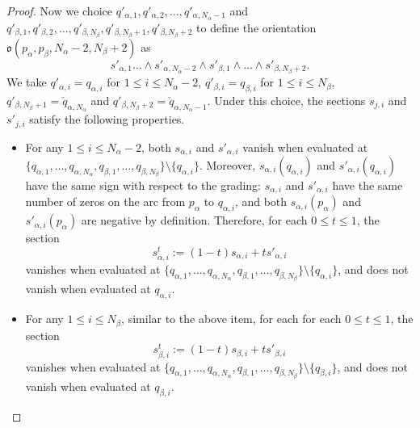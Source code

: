 \documentclass[10pt,a4paper]{amsart}
\begin{document}
\begin{proof}
    Now we choice $q'_{\alpha,1},q'_{\alpha,2},\dots,q'_{\alpha,{N_\alpha-1}}$ and $q'_{\beta,1},q'_{\beta,2},\dots,q'_{\beta,{N_\beta}},q'_{\beta,{N_\beta+1}},q'_{\beta,{N_\beta+2}}$ to define the orientation $\mathfrak o(p_\alpha,p_\beta,N_\alpha-2,N_\beta+2)$ as 
    $$
    s'_{\alpha,1}\dots \wedge s'_{\alpha,N_\alpha-2}\wedge s'_{\beta,1}\wedge \dots \wedge s'_{\beta,N_\beta+2}.
    $$
    We take $q'_{\alpha,i}=q_{\alpha,i}$ for $1\le i \le N_\alpha-2$, $q'_{\beta,i}=q_{\beta,i}$ for $1\le i \le N_\beta$,  $q'_{\beta,N_\beta+1}=\check{q}_{\alpha,N_\alpha}$ and $q'_{\beta,N_\beta+2}=\check{q}_{\alpha,N_\alpha-1}$. 
    Under this choice, the sections $s_{j,i}$ and $s'_{j,i}$ satisfy the following properties.
    \begin{itemize}
        \item For any $1\le i \le N_\alpha-2$, both $s_{\alpha,i}$ and $s'_{\alpha,i}$ vanish when evaluated at $\{q_{\alpha,1},\dots,q_{\alpha,N_\alpha},q_{\beta,1},\dots,q_{\beta,N_\beta}\}\setminus\{q_{\alpha,i}\}$. Moreover, $s_{\alpha,i}(q_{\alpha,i})$ and $s'_{\alpha,i}(q_{\alpha,i})$ have the same sign with respect to the grading: $s_{\alpha,i}$ and $s'_{\alpha,i}$ have the same number of zeros on the arc from $p_\alpha$ to $q_{\alpha,i}$, and both $s_{\alpha,i}(p_\alpha)$ and $s'_{\alpha,i}(p_\alpha)$ are negative by definition. Therefore, for each $0\le t \le 1$, the section
        $$
        s^t_{\alpha,i}:=(1-t)s_{\alpha,i}+ts'_{\alpha,i}
        $$
        vanishes when evaluated at $\{q_{\alpha,1},\dots,q_{\alpha,N_\alpha},q_{\beta,1},\dots,q_{\beta,N_\beta}\}\setminus\{q_{\alpha,i}\}$, and does not vanish when  evaluated at $q_{\alpha,i}$.
        
        \item For any $1\le i \le N_\beta$, similar to the above item, for each for each $0\le t \le 1$, the section
        $$
        s^t_{\beta,i}:=(1-t)s_{\beta,i}+ts'_{\beta,i}
        $$
        vanishes when evaluated at $\{q_{\alpha,1},\dots,q_{\alpha,N_\alpha},q_{\beta,1},\dots,q_{\beta,N_\beta}\}\setminus\{q_{\beta,i}\}$, and does not vanish when  evaluated at $q_{\beta,i}$.
        

\end{itemize}
\end{proof}
\end{document}
